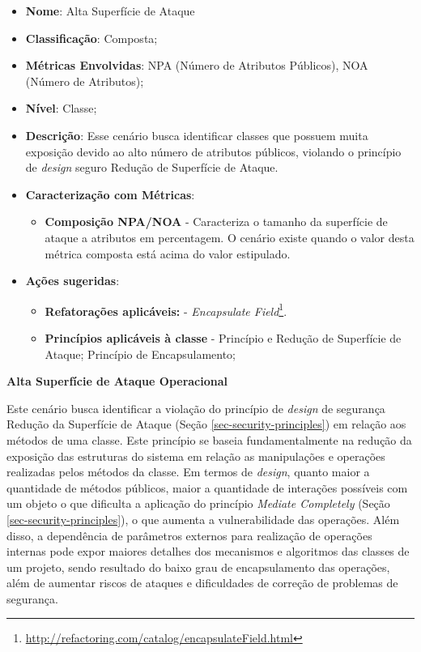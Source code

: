 \begin{itemize}
\item \textbf{Nome}: Alta Superfície de Ataque
\item \textbf{Classificação}: Composta;
\item \textbf{Métricas Envolvidas}: NPA (Número de Atributos Públicos), NOA (Número de Atributos);
\item \textbf{Nível}: Classe;
\item \textbf{Descrição}: Esse cenário busca identificar classes que possuem muita exposição devido ao alto número de atributos públicos, violando o princípio de \emph{design} seguro Redução de Superfície de Ataque.
\item \textbf{Caracterização com Métricas}: 
	\begin{itemize}
	\item \textbf{Composição NPA/NOA} - Caracteriza o tamanho da superfície de ataque a atributos em percentagem. O cenário existe quando o valor desta métrica composta está acima do valor estipulado.
	\end{itemize}
\item \textbf{Ações sugeridas}:
	\begin{itemize}
	\item \textbf{Refatorações aplicáveis:} - \emph{Encapsulate Field}\footnote{\url{http://refactoring.com/catalog/encapsulateField.html}}.
	\item \textbf{Princípios aplicáveis à classe} - Princípio e Redução de Superfície de Ataque; Princípio de Encapsulamento;
	\end{itemize}
\end{itemize}

%

\textbf{Alta Superfície de Ataque Operacional}

%

Este cenário busca identificar a violação do princípio de \emph{design} de segurança Redução da Superfície de Ataque (Seção \ref{sec-security-principles}) em relação aos métodos de uma classe. Este princípio se baseia fundamentalmente na redução da exposição das estruturas do sistema em relação as manipulações e operações realizadas pelos métodos da classe. Em termos de \emph{design}, quanto maior a quantidade de métodos públicos, maior a quantidade de interações possíveis com um objeto o que dificulta a aplicação do princípio \emph{Mediate Completely} (Seção \ref{sec-security-principles}), o que aumenta a vulnerabilidade das operações. Além disso, a dependência de parâmetros externos para realização de operações internas pode expor maiores detalhes dos mecanismos e algoritmos das classes de um projeto, sendo resultado do baixo grau de encapsulamento das operações, além de aumentar riscos de ataques e dificuldades de correção de problemas de segurança. 


